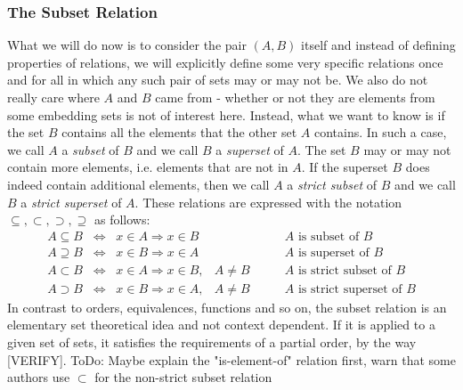 \subsubsection{The Subset Relation} 
What we will do now is to consider the pair $(A,B)$ itself and instead of defining properties of relations, we will explicitly define some very specific relations once and for all in which any such pair of sets may or may not be. We also do not really care where $A$ and $B$ came from - whether or not they are elements from some embedding sets is not of interest here. Instead, what we want to know is if the set $B$ contains all the elements that the other set $A$ contains. In such a case, we call $A$ a \emph{subset} of $B$ and we call $B$ a \emph{superset} of $A$. The set $B$ may or may not contain more elements, i.e. elements that are not in $A$. If the superset $B$ does indeed contain additional elements, then we call $A$ a \emph{strict subset} of $B$ and we call $B$ a \emph{strict superset} of $A$. These relations are expressed with the notation $\subseteq, \subset, \supset, \supseteq$ as follows:
\begin{eqnarray}
A \subseteq B \;\;  \Leftrightarrow \;\;   x \in A \Rightarrow x \in B&           \qquad & \text{$A$ is subset of $B$} \\
A \supseteq B \;\;  \Leftrightarrow \;\;   x \in B \Rightarrow x \in A&           \qquad & \text{$A$ is superset of $B$} \\
A \subset   B \;\;  \Leftrightarrow \;\;   x \in A \Rightarrow x \in B,& A \neq B \qquad & \text{$A$ is strict subset of $B$} \\
A \supset   B \;\;  \Leftrightarrow \;\;   x \in B \Rightarrow x \in A,& A \neq B \qquad & \text{$A$ is strict superset of $B$}
\end{eqnarray}
In contrast to orders, equivalences, functions and so on, the subset relation is an elementary set theoretical idea and not context dependent. If it is applied to a given set of sets, it satisfies the requirements of a partial order, by the way [VERIFY]. ToDo: Maybe explain the "is-element-of" relation first, warn that some authors use $\subset$ for the non-strict subset relation %



